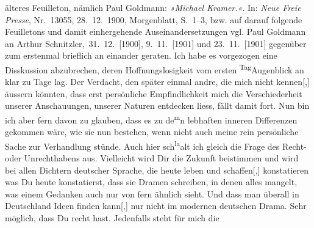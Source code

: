 \begin{ledgroupsized}[t]{13cm}
{{{                  älteres Feuilleton,
                  nämlich Paul Goldmann: \emph{»Michael Kramer.«}. In: \emph{Neue Freie Presse}, Nr. 13055, 28. 12. 1900, Morgenblatt, S. 1–3, bzw. auf darauf folgende
                  Feuilletons und damit einhergehende Auseinandersetzungen vgl. Paul Goldmann an Arthur Schnitzler, 31. 12. [1900], 9. 11. [1901] und 23. 11. [1901]}}}\label{K_L03520-11h} gegenüber zum erstenmal brieflich an
               einander geraten. Ich habe es vorgezogen eine Disskussion abzubrechen, deren
               Hoffnungslosigkeit vom ersten \substVorne{}\textsuperscript{Tag}\substDazwischen{}Augenblick\substHinten{} an klar zu Tage lag. Der Verdacht, den später einmal andre, die mich nicht
                  kennen{[},{]} äussern könnten, dass erst persönliche
               Empfindlichkeit mich die Verschiederheit unserer Anschauungen, unserer Naturen
               entdecken liess, fällt damit fort. Nun bin ich aber
               fern davon zu glauben, dass es zu de\substVorne{}\textsuperscript{m}\substDazwischen{}n\substHinten{} lebhaften inneren Differenzen gekommen wäre, wie sie nun bestehen, wenn
               nicht auch meine rein persönliche Sache zur Verhandlung stünde. Auch hier sch\substVorne{}\textsuperscript{la}\substDazwischen{}al\substHinten{}t ich gle\introOben{}i\introOben{}ch die Frage des Recht- oder
               Unrechthabens aus. Vielleicht wird Dir die Zukunft beisti\introOben{}m\introOben{}men und wird bei allen Dichtern deutscher Sprache, die heute leben und
                  schaffen{[},{]} konstatieren was Du heute konstatierst, dass sie
               Dramen schreiben, in denen alles mangelt, {\pb}was einem Gedanken auch nur von fern
               ähnlich sieht. Und dass man überall in Deutschland Ideen finden kann{[},{]} nur nicht im modernen
               deutschen Drama. Sehr möglich, dass Du recht hast. Jedenfalls steht für mich die

\end{ledgroupsized}
